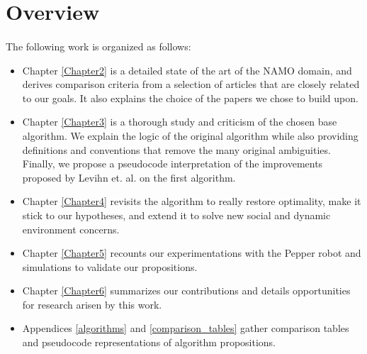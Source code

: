 \section{Overview}

\paragraph{} The following work is organized as follows:

\begin{itemize}
  \item Chapter \ref{Chapter2} is a detailed state of the art of the NAMO domain, and derives comparison criteria from a selection of articles that are closely related to our goals. It also explains the choice of the papers we chose to build upon.
  \item Chapter \ref{Chapter3} is a thorough study and criticism of the chosen base algorithm. We explain the logic of the original algorithm while also providing definitions and conventions that remove the many original ambiguities. Finally, we propose a pseudocode interpretation of the improvements proposed by Levihn et. al. on the first algorithm.
  \item Chapter \ref{Chapter4} revisits the algorithm to really restore optimality, make it stick to our hypotheses, and extend it to solve new social and dynamic environment concerns.
  \item Chapter \ref{Chapter5} recounts our experimentations with the Pepper robot and simulations to validate our propositions.
  \item Chapter \ref{Chapter6} summarizes our contributions and details opportunities for research arisen by this work.
  \item Appendices \ref{algorithms} and \ref{comparison_tables} gather comparison tables and pseudocode representations of algorithm propositions.
\end{itemize}
